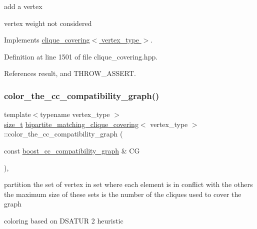 add a vertex 

vertex weight not considered 

Implements \hyperlink{classclique__covering_a69a986de5537f3104ee2cea23a88c49d}{clique\+\_\+covering$<$ vertex\+\_\+type $>$}.



Definition at line 1501 of file clique\+\_\+covering.\+hpp.



References result, and T\+H\+R\+O\+W\+\_\+\+A\+S\+S\+E\+RT.

\mbox{\label{classbipartite__matching__clique__covering_a371f3b2af258c516cb7c2c41b1a93a44}} 
\subsubsection{\texorpdfstring{color\+\_\+the\+\_\+cc\+\_\+compatibility\+\_\+graph()}{color\_the\_cc\_compatibility\_graph()}}
{\footnotesize\ttfamily template$<$typename vertex\+\_\+type $>$ \\
\hyperlink{tutorial__fpt__2017_2intro_2sixth_2test_8c_a7c94ea6f8948649f8d181ae55911eeaf}{size\+\_\+t} \hyperlink{classbipartite__matching__clique__covering}{bipartite\+\_\+matching\+\_\+clique\+\_\+covering}$<$ vertex\+\_\+type $>$\+::color\+\_\+the\+\_\+cc\+\_\+compatibility\+\_\+graph (\begin{DoxyParamCaption}\item[{const \hyperlink{clique__covering__graph_8hpp_af47b1c28cf9a2c360afafb8d80582ce6}{boost\+\_\+cc\+\_\+compatibility\+\_\+graph} \&}]{CG }\end{DoxyParamCaption})\hspace{0.3cm}{\ttfamily [inline]}, {\ttfamily [private]}}



partition the set of vertex in set where each element is in conflict with the others the maximum size of these sets is the number of the cliques used to cover the graph 

coloring based on D\+S\+A\+T\+UR 2 heuristic 

